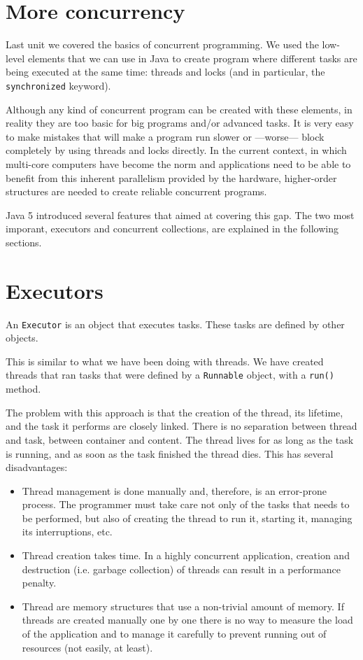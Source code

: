 \section{More concurrency}
\label{sec:more-concurrency}

Last unit we covered the basics of concurrent programming. We used the
low-level elements that we can use in Java to create program where
different tasks are being executed at the same time: threads and
locks (and in particular, the \verb+synchronized+ keyword). 

Although any kind of concurrent program can be created with these
elements, in reality they are too basic for big programs and/or
advanced tasks. It is very easy to make mistakes that will make a
program run slower or ---worse--- block completely by using threads
and locks directly. In the current context, in which multi-core
computers have become the norm and applications need to be able to
benefit from this inherent parallelism provided by the hardware,
higher-order structures are needed to create reliable concurrent
programs. 

Java 5 introduced several features that aimed at covering this
gap. The two most imporant, executors and concurrent collections, are
explained in the following sections.


\section{Executors}
\label{sec:executors}

An \verb+Executor+ is an object that executes tasks. These tasks are
defined by other objects. 

This is similar to what we have been doing with threads. We have
created threads that ran tasks that were defined by a \verb+Runnable+
object, with a \verb+run()+ method. 

The problem with this approach is that the creation of the thread, its
lifetime, and the task it performs are closely linked. There is no
separation between thread and task, between container and
content. The thread lives for as long as the task is running, and as
soon as the task finished the thread dies. This has several
disadvantages: 

\begin{itemize}
\item Thread management is done manually and, therefore, is an
  error-prone process. The programmer must take care not only of the
  tasks that needs to be performed, but also of creating 
  the thread to run it, starting it, managing its interruptions, etc.
\item Thread creation takes time. In a highly concurrent application,
  creation and destruction (i.e. garbage collection) of threads can
  result in a performance penalty.
\item Thread are memory structures that use a non-trivial amount of
  memory. If threads are created manually one by one there is no
  way to measure the load of the application and to manage 
  it carefully to prevent running out of resources (not easily, at
  least). 
\end{itemize}

